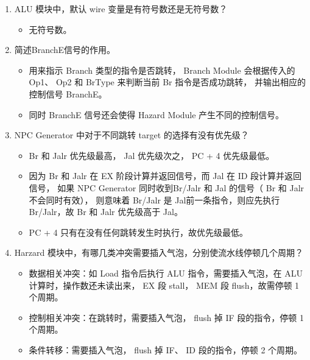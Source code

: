 \documentclass[UTF8]{article}
\begin{document}
\begin{enumerate}
    \item ALU 模块中，默认 wire 变量是有符号数还是无符号数？
    
    \begin{itemize}
        \item 无符号数。
    \end{itemize}
    
    \item 简述BranchE信号的作用。
    
    \begin{itemize}
        \item 用来指示 Branch 类型的指令是否跳转，
        Branch Module 会根据传入的 Op1、 Op2 和 BrType 来判断当前 Br 指令是否成功跳转，
        并输出相应的控制信号 BranchE。
        \item 同时 BranchE 信号还会使得 Hazard Module 产生不同的控制信号。
    \end{itemize}

    \item NPC Generator 中对于不同跳转 target 的选择有没有优先级？
    
    \begin{itemize}
        \item Br 和 Jalr 优先级最高， Jal 优先级次之， PC + 4 优先级最低。
        \item 因为 Br 和 Jalr 在 EX 阶段计算并返回信号，而 Jal 在 ID 段计算并返回信号，
        如果 NPC Generator 同时收到Br/Jalr 和 Jal 的信号（ Br 和 Jalr 不会同时有效），
        则意味着 Br/Jalr 是 Jal前一条指令，则应先执行 Br/Jalr，故 Br 和 Jalr 优先级高于 Jal。
        \item PC + 4 只有在没有任何跳转发生时执行，故优先级最低。
    \end{itemize}
    
    \item Harzard 模块中，有哪几类冲突需要插入气泡，分别使流水线停顿几个周期？
    
    \begin{itemize}
        \item 数据相关冲突：如 Load 指令后执行 ALU 指令，需要插入气泡，在 ALU 计算时，操作数还未读出来，
        EX 段 stall， MEM 段 flush，故需停顿 1 个周期。
        \item 控制相关冲突：在跳转时，需要插入气泡， flush 掉 IF 段的指令，停顿 1 个周期。
        \item 条件转移：需要插入气泡， flush 掉 IF、 ID 段的指令，停顿 2 个周期。
    \end{itemize}
    

\end{enumerate}
\end{document}
